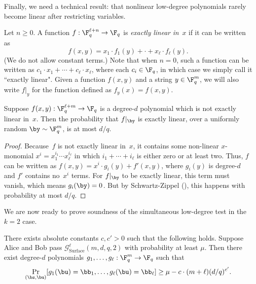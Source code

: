 \documentclass[11pt]{article}
\newcommand{\game}{\mathscr{G}}
\begin{document}
Finally, we need a technical result: that nonlinear low-degree polynomials rarely become linear after restricting variables.

\begin{definition}
Let $n \geq 0$.
A function $f:\F_q^{\ell + n} \rightarrow \F_q$ is \emph{exactly linear in~$x$}
if it can be written as
\begin{equation*}
f(x, y) = x_1 \cdot f_1(y) + \cdot + x_\ell \cdot f_{\ell}(y).
\end{equation*}
(We do not allow constant terms.)
Note that when $n = 0$, such a function can be written as $c_1 \cdot x_1 + \cdots + c_\ell \cdot x_\ell$, where each $c_i \in \F_q$,
in which case we simply call it ``exactly linear".
Given a function $f(x, y)$ and a string $y \in \F_q^m$,
we will also write $f|_y$ for the function defined as $f_y(x) = f(x, y)$.
\end{definition}

\begin{proposition}\label{prop:exactly-linear-prop}
Suppose $f(x, y): \F_q^{\ell + m} \rightarrow \F_q$
is a degree-$d$ polynomial which is not exactly linear in~$x$.
Then the probability that $f|_{\by}$ is exactly linear, over a uniformly random $\by \sim \F_q^m$, is at most $d/q$.
\end{proposition}
\begin{proof}
Because~$f$ is not exactly linear in~$x$, it contains some non-linear $x$-monomial $x^i = x_1^{i_1} \cdots x_\ell^{i_\ell}$
in which $i_1 + \cdots + i_\ell$ is either zero or at least two.
Thus, $f$ can be written as
$f(x, y) = x^i \cdot g_i(y) + f'(x, y)$, where $g_i(y)$ is degree-$d$ and $f'$ contains no~$x^i$ terms.
For $f|_{\by}$ to be exactly linear, this term must vanish, which means $g_i(\by) = 0$.
But by Schwartz-Zippel (), this happens with probability at most $d/q$.
\end{proof}

We are now ready to prove soundness of the simultaneous low-degree test in the $k = 2$ case.

\begin{theorem}\label{thm:simultaneous-raz-safra}
There exists absolute constants $c, c' >0$ such that the following holds.
Suppose Alice and Bob pass $\game_{\mathrm{Surface}}^\ell(m, d, q,2)$ with probability at least $\mu$.
Then there exist degree-$d$ polynomials $g_1, \ldots, g_{\ell} : \F_q^m \rightarrow \F_q$ such that
\begin{equation*}
\Pr_{(\bs, \bu)} [g_1(\bu) = \bb_1, \ldots, g_{\ell}(\bu) = \bb_\ell] \geq \mu - c \cdot (m + \ell) (d/q)^{c'}.
\end{equation*}
\end{theorem}
\end{document}
